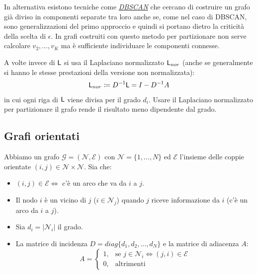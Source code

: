 In alternativa esistono tecniche come \href{https://it.wikipedia.org/wiki/Dbscan}{\textit{DBSCAN}} che cercano di costruire un grafo gi\`a diviso in componenti separate tra loro anche se, come nel caso di DBSCAN, sono generalizzazioni del primo approccio e quindi si portano dietro la criticit\`a della scelta di $\epsilon$. In grafi costruiti con questo metodo per partizionare non serve calcolare $v_2, \dots, v_K$ ma \`e sufficiente individuare le componenti connesse.

A volte invece di $\mathsf{L}$ si usa il Laplaciano normalizzato $\mathsf{L}_{nor}$ (anche se generalmente si hanno le stesse prestazioni della versione non normalizzata):
\begin{equation}
\mathsf{L}_{nor} \coloneqq D^{-1} \mathsf{L} = I - D^{-1} A
\end{equation}
in cui ogni riga di $\mathsf{L}$ viene divisa per il grado $d_i$. Usare il Laplaciano normalizzato per partizionare il grafo rende il risultato meno dipendente dal grado.

\subsection{Grafi orientati}
Abbiamo un grafo $\mathcal{G} = (\mathcal{N}, \mathcal{E})$ con $\mathcal{N} = \{ 1, \dots, N \}$ ed $\mathcal{E}$ l'insieme delle coppie orientate $(i, j) \in \mathcal{N} \times \mathcal{N}$. Sia che:
\begin{itemize}
\item $(i, j) \in \mathcal{E} \iff$ c'\`e un arco che va da $i$ a $j$.
\item Il nodo $i$ \`e un vicino di $j$ ($i \in \mathcal{N}_j$) quando $j$ riceve informazione da $i$ (c'\`e un arco da $i$ a $j$).
\begin{center}
\end{center}
\item Sia $d_i = |\mathcal{N}_i|$ il grado.
\item La matrice di incidenza $D = diag\{d_1, d_2, \dots, d_N \}$ e la matrice di adiacenza $A$:
   \begin{equation}
    A = \begin{cases}
    1, &\text{se } j \in \mathcal{N}_i \iff (j, i) \in \mathcal{E} \\
    0, &\text{altrimenti}
    \end{cases}
   \end{equation}
\end{itemize}

